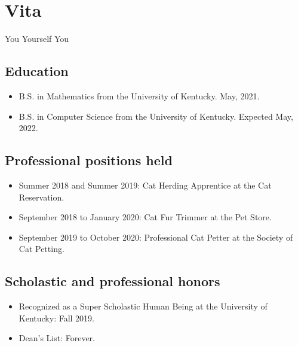 \documentclass{uk_thesis}
\begin{document}
\pagebreak

\chapter{Vita}

    \begin{center}You Yourself You\end{center}

    \section*{Education}

      \begin{itemize}
        \item B.S. in Mathematics from the University of Kentucky. May, 2021.
        \item B.S. in Computer Science from the University of Kentucky. Expected May, 2022.
      \end{itemize}


    \section*{Professional positions held}

        \begin{itemize}
            \item Summer 2018 and Summer 2019: Cat Herding Apprentice at the Cat Reservation.
            \item September 2018 to January 2020: Cat Fur Trimmer at the Pet Store.
            \item September 2019 to October 2020: Professional Cat Petter at the Society of Cat Petting.
        \end{itemize}

    \section*{Scholastic and professional honors}

        \begin{itemize}
            \item Recognized as a Super Scholastic Human Being at the University of Kentucky: Fall 2019.
            \item Dean's List: Forever.
        \end{itemize}
\end{document}
